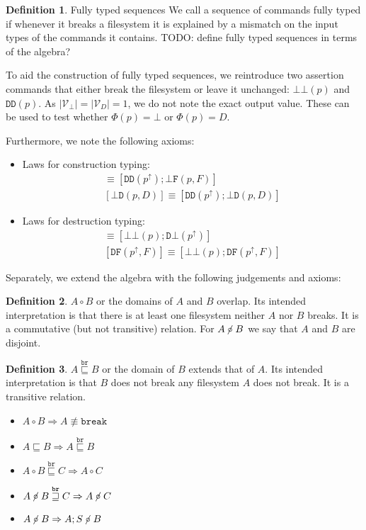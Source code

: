 \documentclass[12pt]{article}
\newcommand{\setvx}[1]{\mathcal{V}_{#1}}
\newcommand{\setd}{\setvx{D}}
\newcommand{\setb}{\setvx{\empt}}
\newcommand{\empt}{\bot}
\newcommand{\FS}{\Phi} %
\newcommand{\pp}{p^\uparrow} %
\newcommand{\cbrk}{\mathtt{break}}
\newcommand{\fscommand}[2]{{#1#2}}
\newcommand{\fsregcommandchar}[1]{\mathtt{#1}}
\newcommand{\fsregcommand}[2]{\fscommand{\fsregcommandchar{#1}}{\fsregcommandchar{#2}}}
\newcommand{\cbb}{\fsregcommand{\empt}{\empt}}
\newcommand{\cbf}{\fsregcommand{\empt}{F}}
\newcommand{\cbd}{\fsregcommand{\empt}{D}}
\newcommand{\cdb}{\fsregcommand{D}{\empt}}
\newcommand{\cdf}{\fsregcommand{D}{F}}
\newcommand{\cdd}{\fsregcommand{D}{D}}
\newcommand{\eqext}{\sqsubseteq}
\newcommand{\nequiv}{\not\equiv}
\newcommand{\wrext}{\stackrel{\mathtt{br}}{\sqsubseteq}}
\newcommand{\wrnrw}{\stackrel{\mathtt{br}}{\sqsupseteq}}
\newcommand{\coworks}{\circ}
\newcommand{\ncoworks}{\centernot\circ}
\theoremstyle{definition}
\newtheorem{mydef}{Definition}
\begin{document}
\begin{mydef}{Fully typed sequences}
We call a sequence of commands fully typed if whenever it breaks a filesystem
it is explained by a mismatch on the input types of the commands it contains.
TODO: define fully typed sequences in terms of the algebra?
\end{mydef}

To aid the construction of fully typed sequences, we reintroduce
two assertion commands that either break the filesystem
or leave it unchanged: $\cbb(p)$ and $\cdd(p)$.
As $|\setb|=|\setd|=1$, we do not note the exact output value.
These can be used to test whether $\FS(p)=\empt$ or $\FS(p)=D$.

Furthermore, we note the following axioms:

\begin{itemize}
\item Laws for construction typing:
   \begin{gather*}
            [\cbf(p, F)] \equiv [\cdd(\pp); \cbf(p, F)]\\
            [\cbd(p, D)] \equiv [\cdd(\pp); \cbd(p, D)]
   \end{gather*}
\item Laws for destruction typing:
   \begin{gather*}
            [\cdb(\pp)] \equiv [\cbb(p); \cdb(\pp)]\\
            [\cdf(\pp, F)] \equiv [\cbb(p); \cdf(\pp, F)]
   \end{gather*}
\end{itemize}

Separately, we extend the algebra with the following judgements and axioms:

\begin{mydef}{$A\coworks B$}
or the domains of $A$ and $B$ overlap.
Its intended interpretation is that
there is at least one filesystem neither $A$ nor $B$ breaks.
It is a commutative (but not transitive) relation.
For $A\ncoworks B$ we say that $A$ and $B$ are disjoint.
\end{mydef}

\begin{mydef}{$A\wrext B$}
or the domain of $B$ extends that of $A$.
Its intended interpretation is that
$B$ does not break any filesystem $A$ does not break.
It is a transitive relation.
\end{mydef}

\begin{itemize}
\item $A\coworks B \Rightarrow A\nequiv\cbrk$
\item $A\eqext B \Rightarrow A\wrext B$
\item $A\coworks B\wrext C \Rightarrow A\coworks C$
\item $A\ncoworks B\wrnrw C \Rightarrow A\ncoworks C$
\item $A\ncoworks B \Rightarrow A;S\ncoworks B$
\end{itemize}
\end{document}
